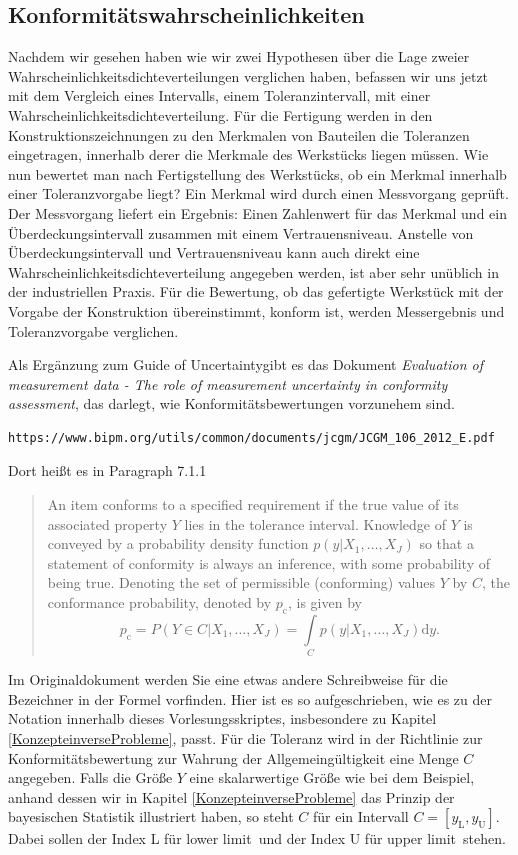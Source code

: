 \subsection{Konformitätswahrscheinlichkeiten}
Nachdem wir gesehen haben wie wir zwei Hypothesen über die Lage zweier Wahrscheinlichkeitsdichteverteilungen
verglichen haben, befassen wir uns jetzt mit dem Vergleich eines Intervalls, einem Toleranzintervall, mit einer
Wahrscheinlichkeitsdichteverteilung. Für die Fertigung werden in den Konstruktionszeichnungen zu den Merkmalen
von Bauteilen die Toleranzen eingetragen, innerhalb derer die Merkmale des Werkstücks liegen müssen. Wie nun
bewertet man nach Fertigstellung des Werkstücks, ob ein Merkmal innerhalb einer Toleranzvorgabe liegt? Ein Merkmal
wird durch einen Messvorgang geprüft. Der Messvorgang liefert ein Ergebnis: Einen Zahlenwert für das Merkmal und
ein Überdeckungsintervall zusammen mit einem Vertrauensniveau. Anstelle von Überdeckungsintervall und Vertrauensniveau
kann auch direkt eine Wahrscheinlichkeitsdichteverteilung angegeben werden, ist aber sehr unüblich in der industriellen
Praxis. Für die Bewertung, ob das gefertigte Werkstück mit der Vorgabe der Konstruktion übereinstimmt, konform ist,
werden Messergebnis und Toleranzvorgabe verglichen.

Als Ergänzung zum \glqq Guide of Uncertainty\grqq gibt es das Dokument
\textsl{Evaluation of measurement data - The role of measurement uncertainty in conformity assessment},
das darlegt, wie Konformitätsbewertungen vorzunehem sind.
\begin{verbatim}
https://www.bipm.org/utils/common/documents/jcgm/JCGM_106_2012_E.pdf
\end{verbatim}
Dort heißt es in Paragraph 7.1.1
\begin{quote}
An item conforms to a specified requirement if the true value of its associated property $Y$ lies in the tolerance
interval. Knowledge of $Y$ is conveyed by a probability density function $p(y|{X_1,\dots,X_J})$
so that a statement of conformity is always an inference,
with some probability of being true. Denoting the set of permissible (conforming) values
$Y$ by $C$, the conformance probability, denoted by $p_\mathrm{c}$, is given by
\begin{equation}
	p_\mathrm{c} = P(Y \in C | {X_1,\dots,X_J}) = \int\limits_C p(y|{X_1,\dots,X_J}) \mathrm{d}y.
\end{equation}
\end{quote}
Im Originaldokument werden Sie eine etwas andere Schreibweise für die Bezeichner in der Formel vorfinden.
Hier ist es so aufgeschrieben, wie es zu der Notation innerhalb dieses Vorlesungsskriptes, insbesondere
zu Kapitel \ref{KonzepteinverseProbleme}, passt.
Für die Toleranz wird in der Richtlinie zur Konformitätsbewertung zur Wahrung der Allgemeingültigkeit
eine Menge $C$ angegeben. Falls die Größe $Y$ eine skalarwertige Größe wie bei dem Beispiel, anhand dessen
wir in Kapitel \ref{KonzepteinverseProbleme} das Prinzip der bayesischen Statistik illustriert haben,
so steht $C$ für ein Intervall $C = [y_\mathrm{L}, y_\mathrm{U}]$. Dabei sollen der Index L für \glqq lower
limit\grqq ~und der Index U für \glqq upper limit\grqq ~stehen.

